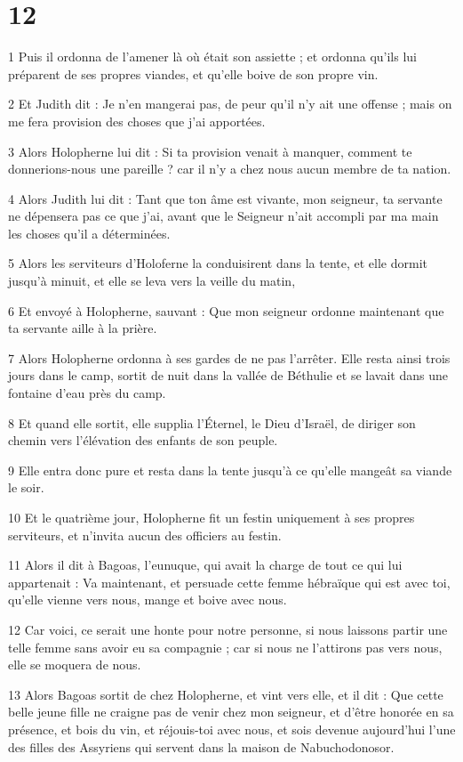 \chapter{12}

\par 1 Puis il ordonna de l'amener là où était son assiette ; et ordonna qu'ils lui préparent de ses propres viandes, et qu'elle boive de son propre vin.
\par 2 Et Judith dit : Je n'en mangerai pas, de peur qu'il n'y ait une offense ; mais on me fera provision des choses que j'ai apportées.
\par 3 Alors Holopherne lui dit : Si ta provision venait à manquer, comment te donnerions-nous une pareille ? car il n'y a chez nous aucun membre de ta nation.
\par 4 Alors Judith lui dit : Tant que ton âme est vivante, mon seigneur, ta servante ne dépensera pas ce que j'ai, avant que le Seigneur n'ait accompli par ma main les choses qu'il a déterminées.
\par 5 Alors les serviteurs d'Holoferne la conduisirent dans la tente, et elle dormit jusqu'à minuit, et elle se leva vers la veille du matin,
\par 6 Et envoyé à Holopherne, sauvant : Que mon seigneur ordonne maintenant que ta servante aille à la prière.
\par 7 Alors Holopherne ordonna à ses gardes de ne pas l'arrêter. Elle resta ainsi trois jours dans le camp, sortit de nuit dans la vallée de Béthulie et se lavait dans une fontaine d'eau près du camp.
\par 8 Et quand elle sortit, elle supplia l'Éternel, le Dieu d'Israël, de diriger son chemin vers l'élévation des enfants de son peuple.
\par 9 Elle entra donc pure et resta dans la tente jusqu'à ce qu'elle mangeât sa viande le soir.
\par 10 Et le quatrième jour, Holopherne fit un festin uniquement à ses propres serviteurs, et n'invita aucun des officiers au festin.
\par 11 Alors il dit à Bagoas, l'eunuque, qui avait la charge de tout ce qui lui appartenait : Va maintenant, et persuade cette femme hébraïque qui est avec toi, qu'elle vienne vers nous, mange et boive avec nous.
\par 12 Car voici, ce serait une honte pour notre personne, si nous laissons partir une telle femme sans avoir eu sa compagnie ; car si nous ne l’attirons pas vers nous, elle se moquera de nous.
\par 13 Alors Bagoas sortit de chez Holopherne, et vint vers elle, et il dit : Que cette belle jeune fille ne craigne pas de venir chez mon seigneur, et d'être honorée en sa présence, et bois du vin, et réjouis-toi avec nous, et sois devenue aujourd'hui l'une des filles des Assyriens qui servent dans la maison de Nabuchodonosor.
